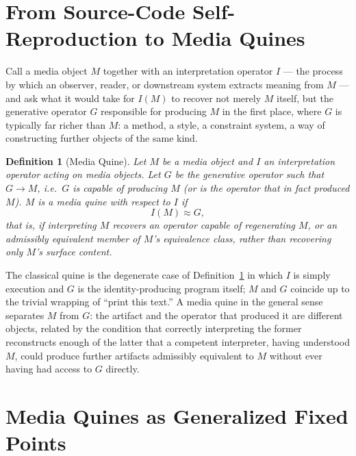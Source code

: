 \documentclass[11pt]{book}
\newtheorem{definition}{Definition}[chapter]
\begin{document}
\section{From Source-Code Self-Reproduction to Media Quines}

Call a media object $M$ together with an interpretation operator $I$ --- the process by which an observer, reader, or downstream system extracts meaning from $M$ --- and ask what it would take for $I(M)$ to recover not merely $M$ itself, but the generative operator $G$ responsible for producing $M$ in the first place, where $G$ is typically far richer than $M$: a method, a style, a constraint system, a way of constructing further objects of the same kind.

\begin{definition}[Media Quine]
\label{def:mediaquine}
Let $M$ be a media object and $I$ an interpretation operator acting on media objects. Let $G$ be the generative operator such that $G \longrightarrow M$, i.e.\ $G$ is capable of producing $M$ (or is the operator that in fact produced $M$). $M$ is a \emph{media quine} with respect to $I$ if
\[
I(M) \approx G,
\]
that is, if interpreting $M$ recovers an operator capable of regenerating $M$, or an admissibly equivalent member of $M$'s equivalence class, rather than recovering only $M$'s surface content.
\end{definition}

The classical quine is the degenerate case of Definition~\ref{def:mediaquine} in which $I$ is simply execution and $G$ is the identity-producing program itself; $M$ and $G$ coincide up to the trivial wrapping of ``print this text.'' A media quine in the general sense separates $M$ from $G$: the artifact and the operator that produced it are different objects, related by the condition that correctly interpreting the former reconstructs enough of the latter that a competent interpreter, having understood $M$, could produce further artifacts admissibly equivalent to $M$ without ever having had access to $G$ directly.

\section{Media Quines as Generalized Fixed Points}
\end{document}
